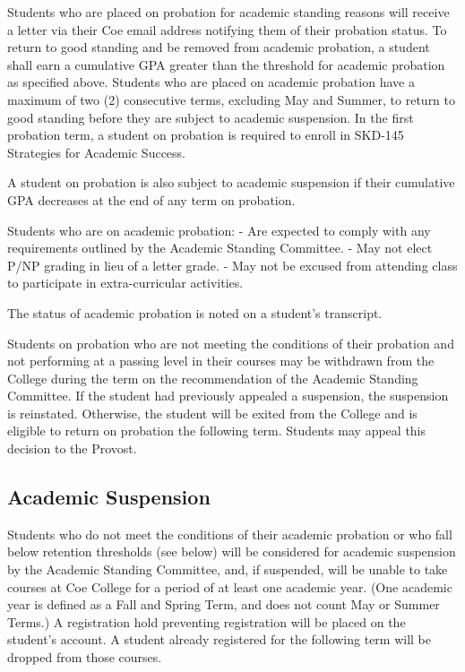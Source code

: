 \documentclass[
  letterpaper,
]{scrbook}
\begin{document}
Students who are placed on probation for academic standing reasons will
receive a letter via their Coe email address notifying them of their
probation status. To return to good standing and be removed from
academic probation, a student shall earn a cumulative GPA greater than
the threshold for academic probation as specified above. Students who
are placed on academic probation have a maximum of two (2) consecutive
terms, excluding May and Summer, to return to good standing before they
are subject to academic suspension. In the first probation term, a
student on probation is required to enroll in SKD-145 Strategies for
Academic Success.

A student on probation is also subject to academic suspension if their
cumulative GPA decreases at the end of any term on probation.

Students who are on academic probation: - Are expected to comply with
any requirements outlined by the Academic Standing Committee. - May not
elect P/NP grading in lieu of a letter grade. - May not be excused from
attending class to participate in extra-curricular activities.

The status of academic probation is noted on a student's transcript.

Students on probation who are not meeting the conditions of their
probation and not performing at a passing level in their courses may be
withdrawn from the College during the term on the recommendation of the
Academic Standing Committee. If the student had previously appealed a
suspension, the suspension is reinstated. Otherwise, the student will be
exited from the College and is eligible to return on probation the
following term. Students may appeal this decision to the Provost.

\subsection{Academic Suspension}\label{academic-suspension}

Students who do not meet the conditions of their academic probation or
who fall below retention thresholds (see below) will be considered for
academic suspension by the Academic Standing Committee, and, if
suspended, will be unable to take courses at Coe College for a period of
at least one academic year. (One academic year is defined as a Fall and
Spring Term, and does not count May or Summer Terms.) A registration
hold preventing registration will be placed on the student's account. A
student already registered for the following term will be dropped from
those courses.
\end{document}
